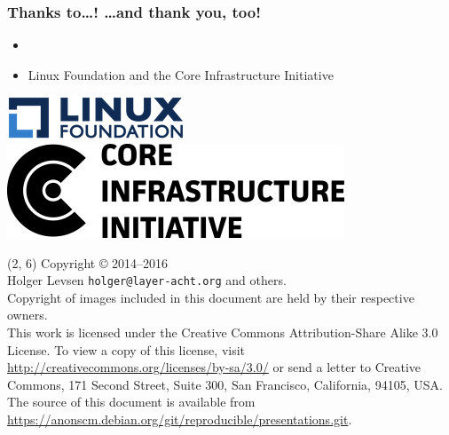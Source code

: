 \documentclass[14pt]{beamer}
\begin{document}
\begin{frame}
 \frametitle{Thanks to…! …and thank \textbf{you}, too!}

 \begin{itemize}
  \item
  \item Linux Foundation and the Core Infrastructure Initiative
\end{itemize}

 \begin{center}
  \includegraphics[height=0.1\paperheight]{images/linux_foundation_logo.png}
  \hspace{0.1\paperwidth}
  \includegraphics[height=0.1\paperheight]{images/cii_logo.png}
 \end{center}

 \vfill
 \begin{center}
 \end{center}
\end{frame}

\begin{frame}{}
\begin{textblock}{12}(2, 6)
    \tiny{
      Copyright \copyright{} 2014--2016 \\
         Holger Levsen \texttt{holger@layer-acht.org} and others.\\[3.0mm]
      Copyright of images included in this document are held by
      their respective owners.
      \\[3.0mm]
      This work is licensed under the \alert{Creative Commons
        Attribution-Share Alike 3.0} License.  To view a copy of this
      license, visit
      \url{http://creativecommons.org/licenses/by-sa/3.0/} or send a
      letter to Creative Commons, 171 Second Street, Suite 300, San
      Francisco, California, 94105, USA.
      \\[2.0mm]
      The source of this document is available from
      \url{https://anonscm.debian.org/git/reproducible/presentations.git}.
    }
  \end{textblock}
\end{frame}
\end{document}
